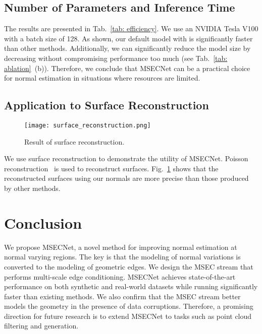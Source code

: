 \documentclass[sigconf]{acmart}
\begin{document}
\subsection{Number of Parameters and Inference Time}\label{sec: efficienncy}
The results are presented in Tab.~\ref{tab: efficiency}. We use an NVIDIA Tesla V100 with a batch size of 128. As shown, our default model with  is significantly faster than other methods. Additionally, we can significantly reduce the model size by decreasing  without compromising performance too much (see Tab.~\ref{tab: ablation}~(b)). Therefore, we conclude that MSECNet can be a practical choice for normal estimation in situations where resources are limited.

\subsection{Application to Surface Reconstruction}\label{sec: surface reconstruction}

\begin{figure}[tb]
  \centering
  \texttt{[image: surface\_reconstruction.png]}
  \caption{Result of surface reconstruction.}
  \Description{}
  \label{fig: reconstruction}
\end{figure}



We use surface reconstruction to demonstrate the utility of MSECNet. Poisson reconstruction~\cite{kazhdan2006poisson} is used to reconstruct surfaces. Fig.~\ref{fig: reconstruction} shows that the reconstructed surfaces using our normals are more precise than those produced by other methods.

\section{Conclusion}
We propose MSECNet, a novel method for improving normal estimation at normal varying regions. The key is that the modeling of normal variations is converted to the modeling of geometric edges. We design the MSEC stream that performs multi-scale edge conditioning. MSECNet achieves state-of-the-art performance on both synthetic and real-world datasets while running significantly faster than existing methods. We also confirm that the MSEC stream better models the geometry in the presence of data corruptions. Therefore, a promising direction for future research is to extend MSECNet to tasks such as point cloud filtering and generation.  
\end{document}
